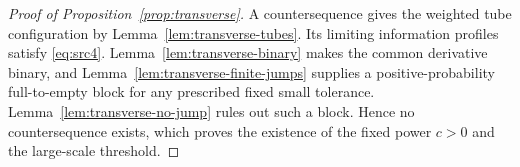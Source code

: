 \begin{proof}[Proof of Proposition~\ref{prop:transverse}]
A countersequence gives the weighted tube configuration by
Lemma~\ref{lem:transverse-tubes}.  Its limiting information profiles
satisfy \eqref{eq:src4}.  Lemma~\ref{lem:transverse-binary} makes
the common derivative binary, and
Lemma~\ref{lem:transverse-finite-jumps} supplies a positive-probability
full-to-empty block for any prescribed fixed small tolerance.
Lemma~\ref{lem:transverse-no-jump} rules out such a block.  Hence
no countersequence exists, which proves the existence of the fixed
power $c>0$ and the large-scale threshold.
\end{proof}
